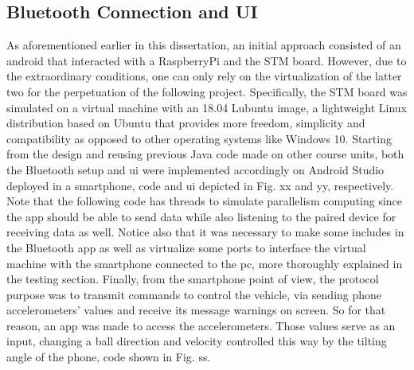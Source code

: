\subsection{Bluetooth Connection and UI}%
\label{sec:bluetooth-connection}
As aforementioned earlier in this dissertation, an initial approach consisted of an android that interacted with a RaspberryPi and the STM board.
%
However, due to the extraordinary conditions, one can only rely on the virtualization of the latter two for the perpetuation of the following project.
Specifically, the STM board was simulated on a virtual machine with an 18.04 Lubuntu image, a lightweight Linux distribution based on Ubuntu that provides more freedom, simplicity and compatibility as opposed to other operating systems like Windows 10.
%
Starting from the design and reusing previous Java code made on other course units, both the Bluetooth setup and \gls{ui} were implemented accordingly on Android Studio deployed in a smartphone, code and \gls{ui} depicted in Fig. xx and yy, respectively.
%
Note that the following code has threads to simulate parallelism computing since the app should be able to send data while also listening to the paired device for receiving data as well.
%
Notice also that it was necessary to make some includes in the Bluetooth app as well as virtualize some ports to interface the virtual machine with the smartphone connected to the pc, more thoroughly explained in the testing section.
%
Finally, from the smartphone point of view, the protocol purpose was to transmit commands to control the vehicle, via sending phone accelerometers' values and receive its message warnings on screen. 
%
So for that reason, an app was made to access the accelerometers. Those values serve as an input, changing a ball direction and velocity controlled this way by the tilting angle of the phone, code shown in Fig. ss.



